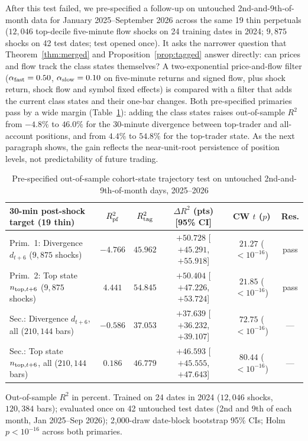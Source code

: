 \documentclass[12pt]{article}
\theoremstyle{definition}
\theoremstyle{remark}
\begin{document}
After this test failed, we pre-specified a follow-up on untouched 2nd-and-9th-of-month data for January 2025--September 2026 across the same 19 thin perpetuals ($12{,}046$ top-decile five-minute flow shocks on 24 training dates in 2024; $9{,}875$ shocks on 42 test dates; test opened once). It asks the narrower question that Theorem~\ref{thm:merged} and Proposition~\ref{prop:tagged} answer directly: can prices and flow track the class states themselves? A two-exponential price-and-flow filter ($\alpha_{\rm fast}=0.50$, $\alpha_{\rm slow}=0.10$ on five-minute returns and signed flow, plus shock return, shock flow and symbol fixed effects) is compared with a filter that adds the current class states and their one-bar changes. Both pre-specified primaries pass by a wide margin (Table~\ref{tab:disc_state_oos}): adding the class states raises out-of-sample $R^2$ from $-4.8\%$ to $46.0\%$ for the 30-minute divergence between top-trader and all-account positions, and from $4.4\%$ to $54.8\%$ for the top-trader state. As the next paragraph shows, the gain reflects the near-unit-root persistence of position levels, not predictability of future trading.

\begin{table}[!htbp]\centering\footnotesize
\begin{threeparttable}
\caption{Pre-specified out-of-sample cohort-state trajectory test on untouched 2nd-and-9th-of-month days, 2025--2026}\label{tab:disc_state_oos}
\setlength{\tabcolsep}{1.4pt}
\begin{tabular}{lccccc}
\toprule
30-min post-shock target (19 thin) & $R^2_{\rm pf}$ & $R^2_{\rm tag}$ & $\Delta R^2$ (pts) [95\% CI] & CW $t$ ($p$) & Res.\\
\midrule
Prim.\ 1: Divergence $d_{t+6}$ ($9{,}875$ shocks) & $-4.766$ & $45.962$ & $+50.728$ [$+45.291$, $+55.918$] & $21.27$ ($<10^{-16}$) & pass\\
Prim.\ 2: Top state $n_{{\rm top},t+6}$ ($9{,}875$ shocks) & $4.441$ & $54.845$ & $+50.404$ [$+47.226$, $+53.724$] & $21.85$ ($<10^{-16}$) & pass\\
Sec.: Divergence $d_{t+6}$, all ($210{,}144$ bars) & $-0.586$ & $37.053$ & $+37.639$ [$+36.232$, $+39.107$] & $72.75$ ($<10^{-16}$) & ---\\
Sec.: Top state $n_{{\rm top},t+6}$, all ($210{,}144$ bars) & $0.186$ & $46.779$ & $+46.593$ [$+45.555$, $+47.643$] & $80.44$ ($<10^{-16}$) & ---\\
\bottomrule
\end{tabular}
\begin{tablenotes}\footnotesize\item Out-of-sample $R^2$ in percent. Trained on 24 dates in 2024 ($12{,}046$ shocks, $120{,}384$ bars); evaluated once on 42 untouched test dates (2nd and 9th of each month, Jan 2025--Sep 2026); 2{,}000-draw date-block bootstrap 95\% CIs; Holm $p<10^{-16}$ across both primaries.\end{tablenotes}
\end{threeparttable}
\end{table}
\end{document}
